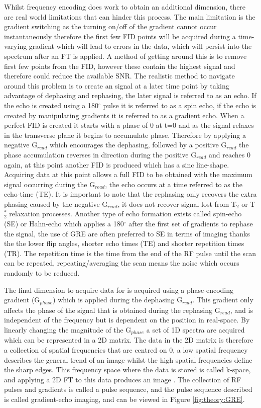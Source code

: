 \documentclass[class=article, crop=false]{standalone}
\begin{document}
Whilst frequency encoding does work to obtain an additional dimension, there are real world limitations that can hinder this process. The main limitation is the gradient switching as the turning on/off of the gradient cannot occur instantaneously therefore the first few FID points will be acquired during a time-varying gradient which will lead to errors in the data, which will persist into the spectrum after an FT is applied. A method of getting around this is to remove first few points from the FID, however these contain the highest signal and therefore could reduce the available SNR. The realistic method to navigate around this problem is to create an signal at a later time point by taking advantage of dephasing and rephasing, the later signal is referred to as an echo. If the echo is created using a 180$^\circ$ pulse it is referred to as a spin echo, if the echo is created by manipulating gradients it is referred to as a gradient echo. When a perfect FID is created it starts with a phase of 0 at t=0 and as the signal relaxes in the transverse plane it begins to accumulate phase. Therefore by applying a negative G$_{read}$ which encourages the dephasing, followed by a positive G$_{read}$ the phase accumulation reverses in direction during the positive G$_{read}$ and reaches 0 again, at this point another FID is produced which has a sinc line-shape. Acquiring data at this point allows a full FID to be obtained with the maximum signal occurring during the G$_{read}$, the echo occurs at a time referred to as the echo-time (TE). It is important to note that the rephasing only recovers the extra phasing caused by the negative G$_{read}$, it does not recover signal lost from T$_2$ or T$_2^*$ relaxation processes. Another type of echo formation exists called spin-echo (SE) or Hahn-echo \cite{Hahn1950SpinEchoes} which applies a 180$^\circ$ after the first set of gradients to rephase the signal, the use of GRE are often preferred to SE in terms of imaging thanks the the lower flip angles, shorter echo times (TE) and shorter repetition times (TR). The repetition time is the time from the end of the RF pulse until the scan can be repeated, repeating/averaging the scan means the noise which occurs randomly to be reduced.

The final dimension to acquire data for is acquired using a phase-encoding gradient (G$_{phase}$) which is applied during the dephasing G$_{read}$. This gradient only affects the phase of the signal that is obtained during the rephasing G$_{read}$, and is independent of the frequency but is dependent on the position in real-space. By linearly changing the magnitude of the G$_{phase}$ a set of 1D spectra are acquired which can be represented in a 2D matrix. The data in the 2D matrix is therefore a collection of spatial frequencies that are centred on 0, a low spatial frequency describes the general trend of an image whilst the high spatial frequencies define the sharp edges. This frequency space where the data is stored is called k-space, and applying a 2D FT to this data produces an image \cite{Lauterbur1973ImageResonance, Mansfield1977Multi-planarEchoes}. The collection of RF pulses and gradients is called a pulse sequence, and the pulse sequence described is called gradient-echo imaging, and can be viewed in Figure \ref{fig:theory:GRE}.
\end{document}
